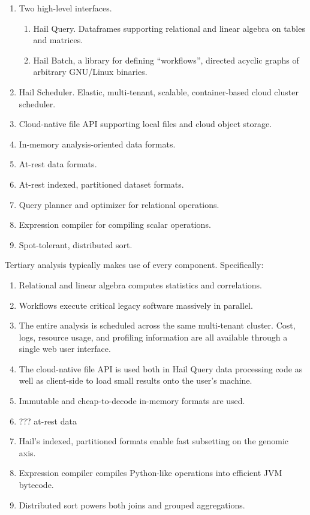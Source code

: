 \documentclass[10pt,a4paper%
]{article}
\begin{document}
\begin{enumerate}
\item Two high-level interfaces.
  \begin{enumerate}
  \item Hail Query. Dataframes supporting relational and linear algebra on tables and matrices.
  \item Hail Batch, a library for defining ``workflows'', directed acyclic graphs of arbitrary
    GNU/Linux binaries.
  \end{enumerate}
\item Hail Scheduler. Elastic, multi-tenant, scalable, container-based cloud cluster scheduler.
\item Cloud-native file API supporting local files and cloud object storage.
\item In-memory analysis-oriented data formats.
\item At-rest data formats.
\item At-rest indexed, partitioned dataset formats.
\item Query planner and optimizer for relational operations.
\item Expression compiler for compiling scalar operations.
\item Spot-tolerant, distributed sort.
\end{enumerate}

Tertiary analysis typically makes use of every component. Specifically:

\begin{enumerate}
\item Relational and linear algebra computes statistics and correlations.
\item Workflows execute critical legacy software massively in parallel.
\item The entire analysis is scheduled across the same multi-tenant cluster. Cost, logs, resource
  usage, and profiling information are all available through a single web user interface.
\item The cloud-native file API is used both in Hail Query data processing code as well as
  client-side to load small results onto the user's machine.
\item Immutable and cheap-to-decode in-memory formats are used.
\item ??? at-rest data
\item Hail's indexed, partitioned formats enable fast subsetting on the genomic axis.
\item Expression compiler compiles Python-like operations into efficient JVM bytecode.
\item Distributed sort powers both joins and grouped aggregations.
\end{enumerate}
\end{document}
